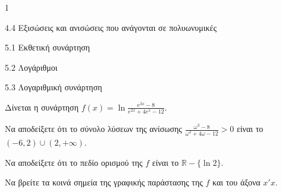 \begin{ylh}{1}
\item 4.4 Εξισώσεις και ανισώσεις που ανάγονται σε πολυωνυμικές
\item 5.1 Εκθετική συνάρτηση
\item 5.2 Λογάριθμοι
\item 5.3 Λογαριθμική συνάρτηση
\end{ylh}
Δίνεται η συνάρτηση $f(x) = \ln \frac{e^{3x} - 8}{e^{2x} + 4e^x - 12}$.
\begin{alist}
\item Να αποδείξετε ότι το σύνολο λύσεων της ανίσωσης $\frac{\omega^3 - 8}{\omega^2 + 4\omega - 12} > 0$ είναι το $(-6, 2) \cup (2, +\infty)$.
\item Να αποδείξετε ότι το πεδίο ορισμού της $f$ είναι το $\mathbb{R} - \{\ln 2\}$.
\item Να βρείτε τα κοινά σημεία της γραφικής παράστασης της $f$ και του άξονα $x'x$.
\end{alist}

